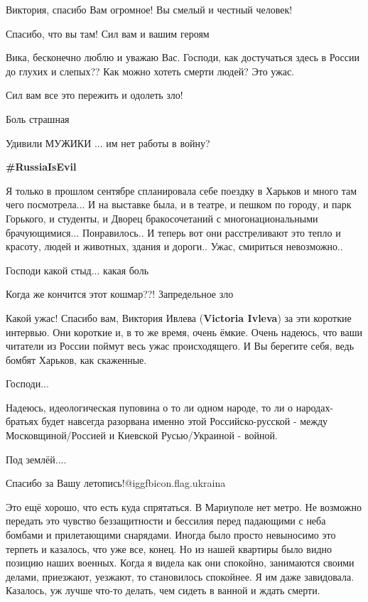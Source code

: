 \begin{itemize}

Виктория, спасибо Вам огромное! Вы смелый и честный человек!

Спасибо, что вы там! Сил вам и вашим героям


Вика, бесконечно люблю и уважаю Вас. Господи, как достучаться здесь в России до
глухих и слепых?? Как можно хотеть смерти людей? Это ужас.

Сил вам все это пережить и одолеть зло!

Боль страшная

Удивили МУЖИКИ ... им нет работы в войну?

\textbf{\#RussiaIsEvil}


Я только в прошлом сентябре спланировала себе поездку в Харьков и много там
чего посмотрела... И на выставке была, и в театре, и пешком по городу, и парк
Горького, и студенты, и Дворец бракосочетаний с многонациональными
брачующимися... Понравилось.. И теперь вот они расстреливают это тепло и
красоту, людей и животных, здания и дороги.. Ужас, смириться невозможно..

Господи какой стыд... какая боль

Когда же кончится этот кошмар??! Запредельное зло


Какой ужас! Спасибо вам, Виктория Ивлева (\textbf{Victoria Ivleva}) за эти короткие
интервью. Они короткие и, в то же время, очень ёмкие. Очень надеюсь, что ваши
читатели из России поймут весь ужас происходящего. И Вы берегите себя, ведь
бомбят Харьков, как скаженные.

Господи...


Надеюсь, идеологическая пуповина о то ли одном народе, то ли о народах-братьях
будет навсегда разорвана именно этой Российско-русской - между
Московщиной/Россией и Киевской Русью/Украиной - войной.

Под землёй....

Спасибо за Вашу летопись!@igg{fbicon.flag.ukraina}


Это ещё хорошо, что есть куда спрятаться. В Мариуполе нет метро. Не возможно
передать это чувство беззащитности и бессилия перед падающими с неба бомбами и
прилетающими снарядами. Иногда было просто невыносимо это терпеть и казалось,
что уже все, конец. Но из нашей квартиры было видно позицию наших военных.
Когда я видела как они спокойно, занимаются своими делами, приезжают, уезжают,
то становилось спокойнее. Я им даже завидовала. Казалось, уж лучше что-то
делать, чем сидеть в ванной и ждать смерти.


\end{itemize}
